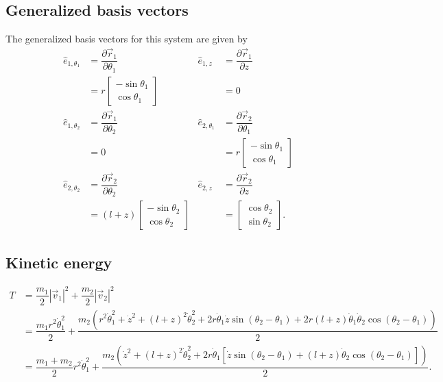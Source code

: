 \documentclass[12pt,a4paper,portrait]{article}
\begin{document}
\subsection{Generalized basis vectors}
The generalized basis vectors for this system are given by
\begin{align*}
	\hat{e}_{1, \theta_1} &= \dfrac{\partial \vec{r}_1}{\partial \theta_1} & \hat{e}_{1, z} &= \dfrac{\partial \vec{r}_1}{\partial z} \\
	&= r\begin{bmatrix}
		-\sin{\theta_1} \\
		\cos{\theta_1}
	\end{bmatrix} & &= 0 \\
	 \hat{e}_{1, \theta_2} &= \dfrac{\partial \vec{r}_1}{\partial \theta_2} & \hat{e}_{2, \theta_1} &= \dfrac{\partial \vec{r}_2}{\partial \theta_1} \\
	 &=0 & &= r\begin{bmatrix}
	 	-\sin{\theta_1} \\
	 	\cos{\theta_1}
	 \end{bmatrix} \\
	\hat{e}_{2, \theta_2} &= \dfrac{\partial \vec{r}_2}{\partial \theta_2} & \hat{e}_{2, z} &=\dfrac{\partial \vec{r}_2}{\partial z}\\
	&= (l+z)\begin{bmatrix}
		-\sin{\theta_2} \\
		\cos{\theta_2}
	\end{bmatrix} & &= \begin{bmatrix}
	\cos{\theta_2}\\
	\sin{\theta_2}
	\end{bmatrix}.
\end{align*}

\subsection{Kinetic energy}
\begin{align*}
	T &= \dfrac{m_1}{2}|\vec{v}_1|^2 + \dfrac{m_2}{2}|\vec{v}_2|^2 \\
	&= \dfrac{m_1r^2 \dot{\theta}_1^2}{2} + \dfrac{m_2(r^2 \dot{\theta}_1^2 + \dot{z}^2 + (l+z)^2\dot{\theta}_2^2 + 2r\dot{\theta}_1 \dot{z} \sin{(\theta_2-\theta_1)} + 2r(l+z)\dot{\theta}_1\dot{\theta}_2\cos{(\theta_2 - \theta_1)})}{2}\\
	&= \dfrac{m_1+m_2}{2}r^2\dot{\theta}_1^2 + \dfrac{m_2(\dot{z}^2 + (l+z)^2\dot{\theta}_2^2 + 2r\dot{\theta}_1[ \dot{z} \sin{(\theta_2-\theta_1)} + (l+z)\dot{\theta}_2\cos{(\theta_2 - \theta_1)}])}{2}.
\end{align*}
\end{document}

